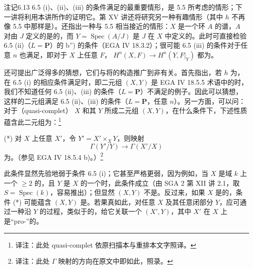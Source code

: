 \begin{SGAresult}{注记}{6.13}
6.5 (i)、(ii)、(iii) 的条件满足的最重要情形，是 5.5 所考虑的情形；下一讲将利用本讲所作的证明它。第 XV 讲还将研究另一种有趣情形（其中 $h$ 不再像 5.5 中那样是）。还指出一种与 5.5 相当接近的情形：$X$ 是一个环 $A$ 的谱，$A$ 对由 $J$ 定义的是的，而 $Y=\operatorname{Spec}(A/J)$ 是 $J$ 在 $X$ 中定义的。此时可直接检验 6.5 (ii)（$L=\mathbf P$）的 b'') 的条件（EGA IV 18.3.2）；很可能 6.5 (iii) 的条件对于任意 $n$ 也满足，即对于 $X$ 上任意 $F$， $H^n(X,F)\to H^n(Y,F|_Y)$ 都为。

还可提出广泛得多的猜想，它们与将的构造推广到非有关。首先指出，若 $h$ 为，在 6.5 (i) 的相应条件满足时，即二元组 $(X,Y)$ 是 EGA IV 18.5.5 术语中的时，我们不知道任何 6.5 (ii)、(iii) 的条件（$L=\mathbf P$）不满足的例子。因此可以猜想，这样的二元组满足 6.5 (ii)、(iii) 的条件（$L=\mathbf P$，任意 $n$）。另一方面，可以问：对于（quasi-complet） $X$ 和其 $Y$ 所成二元组 $(X,Y)$，在什么条件下，下述性质蕴含此二元组为：\footnote{译注：此处 quasi-complet 依原扫描本与重排本文字照译。}

(*) 对 $X$ 上任意 $X'$，令 $Y'=X'\times_XY$，则映射
\[
\Gamma(Y'/Y)\longrightarrow\Gamma(X'/X)
\]
为。（参见 EGA IV 18.5.4 b)。）\footnote{译注：此处 $\Gamma$ 映射的方向在原文中即如此，照录。}

此条件显然先验地弱于条件 6.5 (i)；它甚至严格更弱，因为例如，当 $X$ 是域 $k$ 上一个 $\geq2$ 的，且 $Y$ 是 $X$ 的一个时，此条件成立（由 SGA 2 第 XII 讲 2.1，取 $S=\operatorname{Spec}(k)$，容易推出）；但显然 $(X,Y)$ 不是。反过来，如果 $X$ 是的，条件 (*) 可能蕴含 $(X,Y)$ 是。若果真如此，对任意 $X$ 及其任意闭部分 $Y$，应可通过一种沿 $Y$ 的过程，类似于的，给它关联一个 $(X',Y)$，其中 $X'$ 在 $X$ 上是“pro-”的。


\end{SGAresult}
